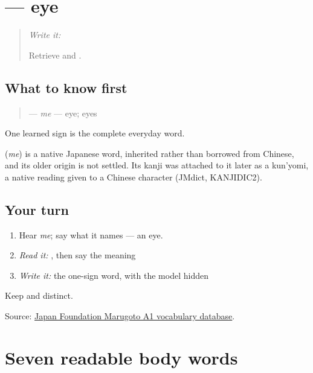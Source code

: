 \section[\texorpdfstring{\ja{め} (me)}{め (me)}]{ — eye}

\label{lesson:JA-C11-me-eye}



\begin{quote}
\emph{Write it:} \textbf{}

Retrieve \textbf{} and \textbf{}.
\end{quote}

\subsection*{What to know first}
\begin{quote}
\textbf{} — \emph{me} — eye; eyes
\end{quote}

One learned sign is the complete everyday word.

\begin{cousinweb}
\textbf{} (\emph{me}) is a native Japanese word, inherited rather than borrowed from Chinese, and its older origin is not settled. Its kanji was attached to it later as a kun'yomi, a native reading given to a Chinese character (JMdict, KANJIDIC2).
\end{cousinweb}

\subsection*{Your turn}
\begin{enumerate}
\raggedright
  \item Hear \emph{me}; say what it names — an eye.
  \item \emph{Read it:} \textbf{}, then say the meaning
  \item \emph{Write it:} the one-sign word, with the model hidden
\end{enumerate}

\begin{tcolorbox}[breakable,colback=teal!4,colframe=teal!35!black,title={Before you move on}]
Keep \textbf{} and \textbf{} distinct.

Source: \href{https://words.marugotoweb.jp/}{Japan Foundation Marugoto A1 vocabulary database}.
\end{tcolorbox}
\section[\texorpdfstring{\ja{て・みみ・くち} … (te, mimi, kuchi …)}{て・みみ・くち … (te, mimi, kuchi …)}]{Seven readable body words}

